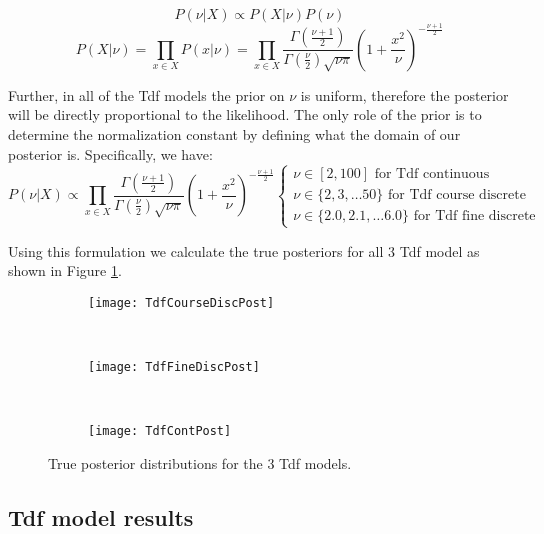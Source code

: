 \[P(\nu|X) \propto P(X|\nu)P(\nu)\]
\[P(X|\nu) = \prod_{x \in X} P(x|\nu) = \prod_{x \in X} \frac{\Gamma \left( \frac{\nu+1}{2} \right)}{\Gamma \left( \frac{\nu}{2} \right) \sqrt{\nu \pi}} \left( 1 + \frac{x^2}{\nu} \right)^{-\frac{\nu+1}{2}} \]

Further, in all of the Tdf models the prior on $\nu$ is uniform, therefore the posterior will be directly proportional to the likelihood. The only role of the prior is to determine the normalization constant by defining what the domain of our posterior is. Specifically, we have:
\[P(\nu|X) \propto 
  \prod_{x \in X} \frac{\Gamma \left( \frac{\nu+1}{2} \right)}{\Gamma \left( \frac{\nu}{2} \right) \sqrt{\nu \pi}} \left( 1 + \frac{x^2}{\nu} \right)^{-\frac{\nu+1}{2}}
  \left\{
	  \begin{array}{lll}
		  \nu \in [2,100] \mbox{ for Tdf continuous} \\
		  \nu \in \{2, 3, \ldots 50\} \mbox{ for Tdf course discrete} \\
      \nu \in \{2.0, 2.1, \ldots 6.0\} \mbox{ for Tdf fine discrete}
	  \end{array}
  \right.\]

Using this formulation we calculate the true posteriors for all 3 Tdf model as shown in Figure \ref{fig:tdfPosts}.

\begin{figure}[h]
        \centering
        \begin{subfigure}[b]{0.31\textwidth}
                \centering
                \texttt{[image: TdfCourseDiscPost]}
        \end{subfigure}
        ~ 
        \begin{subfigure}[b]{0.31\textwidth}
                \centering
                \texttt{[image: TdfFineDiscPost]}
        \end{subfigure}
        ~ 
        \begin{subfigure}[b]{0.31\textwidth}
                \centering
                \texttt{[image: TdfContPost]}
        \end{subfigure}
    \caption{True posterior distributions for the 3 Tdf models.}
    \label{fig:tdfPosts}
\end{figure}

\subsection{Tdf model results}

